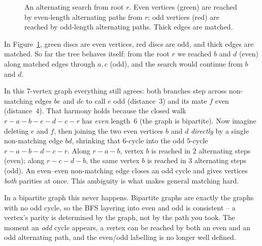 \begin{figure}[htbp]
\centering
{}
\caption{An alternating search from root $r$. Even vertices (green) are reached by even-length alternating paths from $r$; odd vertices (red) are reached by odd-length alternating paths. Thick edges are matched.}
\label{ch17:fig-alternating-tree}
\end{figure}

In Figure~\ref{ch17:fig-alternating-tree}, green discs are even vertices, red discs are odd, and thick edges are matched. So far the tree behaves
itself: from the root $r$ we reached $b$ and $d$ (even) along matched edges through $a,c$ (odd), and
the search would continue from $b$ and $d$.

In this $7$-vertex graph everything still agrees: both branches step across non-matching edges $be$
and $de$ to call $e$ odd (distance~$3$) and its mate $f$ even (distance~$4$). That harmony holds
because the closed walk $r\!-\!a\!-\!b\!-\!e\!-\!d\!-\!c\!-\!r$ has \emph{even} length~$6$ (the graph
is bipartite). Now imagine deleting $e$ and $f$, then joining the two even vertices $b$ and $d$
\emph{directly} by a single non-matching edge $bd$, shrinking that $6$-cycle into the odd $5$-cycle
$r\!-\!a\!-\!b\!-\!d\!-\!c\!-\!r$. Along $r\!-\!a\!-\!b$, vertex $b$ is reached in $2$ alternating
steps (even); along $r\!-\!c\!-\!d\!-\!b$, the same vertex $b$ is reached in $3$ alternating
steps (odd). An even--even non-matching edge closes an odd cycle and gives vertices \emph{both}
parities at once. This ambiguity is what makes general matching hard.

\begin{intuitionbox}
In a bipartite graph this never happens. Bipartite graphs are exactly the graphs with no odd cycle,
so the BFS layering into even and odd is consistent -- a vertex's parity is determined by the graph,
not by the path you took. The moment an \emph{odd} cycle appears, a vertex can be reached by both an
even and an odd alternating path, and the even/odd labelling is no longer well defined.
\end{intuitionbox}

